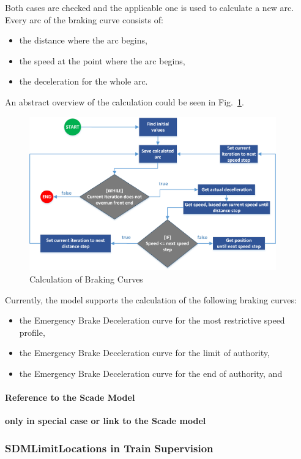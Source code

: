 Both cases are checked and the applicable one is used to calculate a new arc. Every arc of the braking curve consists of:
\begin{itemize}
\item the distance where the arc begins,
\item the speed at the point where the arc begins,
\item the deceleration for the whole arc.
\end{itemize}
An abstract overview of the calculation could be seen in Fig.~\ref{fig:bc_calc}.
\begin{figure}[!h]
\centering
\includegraphics[width=0.95\textwidth]{../images/EBD_CalcAlgorithm.png}
\caption{Calculation of Braking Curves}\label{fig:bc_calc}
\end{figure}

Currently, the model supports the calculation of the following braking curves:
\begin{itemize}
	\item the Emergency Brake Deceleration curve for the most restrictive speed profile,
	\item the Emergency Brake Deceleration curve for the limit of authority,
	\item the Emergency Brake Deceleration curve for the end of authority, and
\end{itemize}
\paragraph{Reference to the Scade Model}
\textbf{only in special case or link to the Scade model}

\subsubsection{SDMLimitLocations in Train Supervision}
